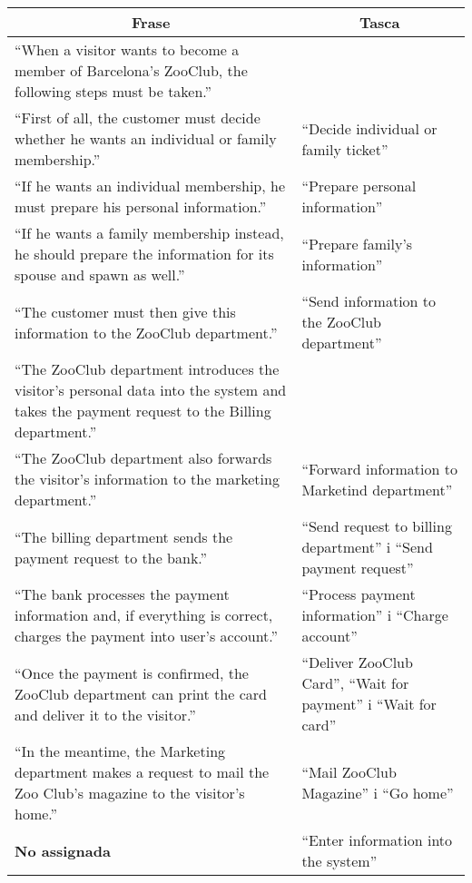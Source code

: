 \begin{center}
\begin{tabular}{|p{}|p{}|}
    \hline
    \multicolumn{1}{|c}{\textbf{Frase}} & \multicolumn{1}{|c|}{\textbf{Tasca}} \\ \hline\hline
    ``When a visitor wants to become a member of Barcelona's ZooClub, the following steps must be taken.'' & \\\hline
    ``First of all, the customer must decide whether he wants an individual or family membership.'' & ``Decide individual or family ticket''\\\hline
    ``If he wants an individual membership, he must prepare his personal information.'' & ``Prepare personal information'' \\\hline
    ``If he wants a family membership instead, he should prepare the information for its spouse and spawn as well.'' & ``Prepare family's information'' \\\hline
    ``The customer must then give this information to the ZooClub department.'' & ``Send information to the ZooClub department'' \\\hline
    ``The ZooClub department introduces the visitor's personal data into the system and takes the payment request to the Billing department.'' & \\\hline
    ``The ZooClub department also forwards the visitor's information to the marketing department.'' & ``Forward information to Marketind department'' \\\hline
    ``The billing department sends the payment request to the bank.'' &``Send request to billing department'' i ``Send payment request'' \\\hline
    ``The bank processes the payment information and, if everything is correct, charges the payment into user's account.'' & ``Process payment information'' i  ``Charge account'' \\\hline
    ``Once the payment is confirmed, the ZooClub department can print the card and deliver it to the visitor.'' & ``Deliver ZooClub Card'', ``Wait for payment'' i ``Wait for card''\\\hline
    ``In the meantime, the Marketing department makes a request to mail the Zoo Club's magazine to the visitor's home.'' & ``Mail ZooClub Magazine'' i ``Go home'' \\\hline
    \textbf{No assignada} & ``Enter information into the system'' \\\hline
\end{tabular}
\end{center}

